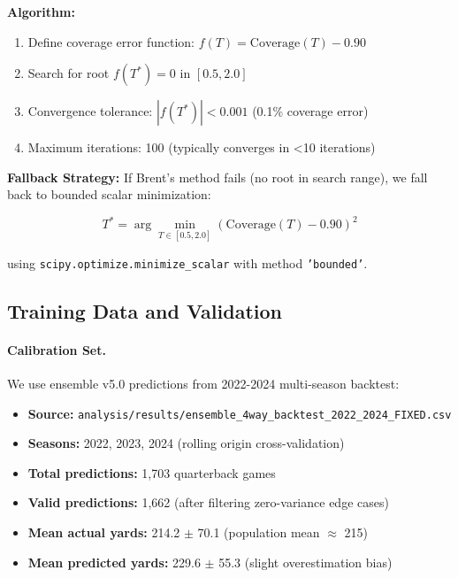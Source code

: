 \textbf{Algorithm:}
\begin{enumerate}[itemsep=2pt,parsep=0pt]
    \item Define coverage error function: $f(T) = \text{Coverage}(T) - 0.90$
    \item Search for root $f(T^*) = 0$ in $[0.5, 2.0]$
    \item Convergence tolerance: $|f(T^*)| < 0.001$ (0.1\% coverage error)
    \item Maximum iterations: 100 (typically converges in <10 iterations)
\end{enumerate}

\textbf{Fallback Strategy:}
If Brent's method fails (no root in search range), we fall back to bounded scalar minimization:

\begin{equation}
T^* = \arg\min_{T \in [0.5, 2.0]} \left( \text{Coverage}(T) - 0.90 \right)^2
\end{equation}

using \texttt{scipy.optimize.minimize\_scalar} with method \texttt{'bounded'}.

\subsection{Training Data and Validation}

\paragraph{Calibration Set.}
We use ensemble v5.0 predictions from 2022-2024 multi-season backtest:

\begin{itemize}[itemsep=2pt,parsep=0pt]
    \item \textbf{Source:} \texttt{analysis/results/ensemble\_4way\_backtest\_2022\_2024\_FIXED.csv}
    \item \textbf{Seasons:} 2022, 2023, 2024 (rolling origin cross-validation)
    \item \textbf{Total predictions:} 1,703 quarterback games
    \item \textbf{Valid predictions:} 1,662 (after filtering zero-variance edge cases)
    \item \textbf{Mean actual yards:} 214.2 $\pm$ 70.1 (population mean $\approx$ 215)
    \item \textbf{Mean predicted yards:} 229.6 $\pm$ 55.3 (slight overestimation bias)
\end{itemize}

